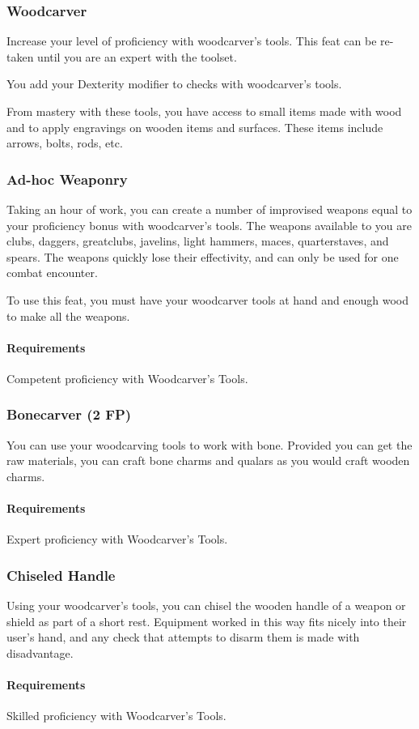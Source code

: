     \subsubsection{Woodcarver} \label{feat::woodcarver}
        Increase your level of proficiency with woodcarver's tools.
        This feat can be re-taken until you are an expert with the toolset.

        You add your Dexterity modifier to checks with woodcarver's tools.

        From mastery with these tools, you have access to small items made with wood and to apply engravings on wooden items and surfaces.
        These items include arrows, bolts, rods, etc.
    \subsubsection{Ad-hoc Weaponry} \label{feat::adhocweaponry}
        Taking an hour of work, you can create a number of improvised weapons equal to your proficiency bonus with woodcarver's tools.
        The weapons available to you are clubs, daggers, greatclubs, javelins, light hammers, maces, quarterstaves, and spears.
        The weapons quickly lose their effectivity, and can only be used for one combat encounter.

        To use this feat, you must have your woodcarver tools at hand and enough wood to make all the weapons.
        \paragraph{Requirements} Competent proficiency with Woodcarver's Tools.
    \subsubsection{Bonecarver (2 FP)} \label{feat::bonecarver}
        You can use your woodcarving tools to work with bone.
        Provided you can get the raw materials, you can craft bone charms and qualars as you would craft wooden charms.
        \paragraph{Requirements} Expert proficiency with Woodcarver's Tools.
    \subsubsection{Chiseled Handle} \label{feat::chiseledhandle}
        Using your woodcarver's tools, you can chisel the wooden handle of a weapon or shield as part of a short rest.
        Equipment worked in this way fits nicely into their user's hand, and any check that attempts to disarm them is made with disadvantage.
        \paragraph{Requirements} Skilled proficiency with Woodcarver's Tools.

\newpage
